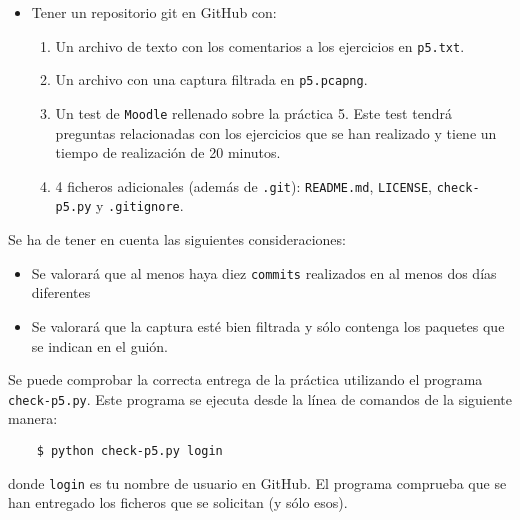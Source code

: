 \documentclass[11pt,a4paper]{article}
\begin{document}
\begin{itemize}
  \item Tener un repositorio git en GitHub con:
  \begin{enumerate}
    \item Un archivo de texto con los comentarios a los ejercicios en \texttt{p5.txt}.
    \item Un archivo con una captura filtrada en \texttt{p5.pcapng}.
    \item Un test de \texttt{Moodle} rellenado sobre la práctica 5. Este test tendrá preguntas relacionadas con los ejercicios que se han realizado y tiene un tiempo de realización de 20 minutos.
    \item 4 ficheros adicionales (además de \texttt{.git}): \texttt{README.md}, \texttt{LICENSE}, \texttt{check-p5.py} y \texttt{.gitignore}.
  \end{enumerate}
\end{itemize}

Se ha de tener en cuenta las siguientes consideraciones:
\begin{itemize}
  \item Se valorará que al menos haya diez \texttt{commits} realizados en al menos dos días diferentes
  \item Se valorará que la captura esté bien filtrada y sólo contenga los paquetes que se indican en el guión.
\end{itemize}

Se puede comprobar la correcta entrega de la práctica utilizando el programa \texttt{check-p5.py}. Este programa se ejecuta desde la línea de comandos de la siguiente manera:
\begin{verbatim}
	$ python check-p5.py login
\end{verbatim}


donde \texttt{login} es tu nombre de usuario en GitHub. El programa comprueba que se han entregado los ficheros que se solicitan (y sólo esos). 



\end{document}

